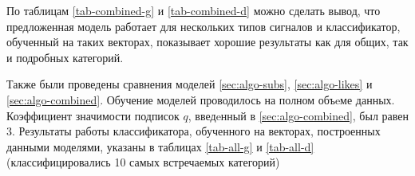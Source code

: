 \documentclass[times,specification,annotation]{itmo-student-thesis}
\begin{document}
%


По таблицам \ref{tab-combined-g} и \ref{tab-combined-d} можно сделать вывод, что предложенная модель работает для нескольких типов сигналов и классификатор, обученный на таких векторах, показывает хорошие результаты как для общих, так и подробных категорий.

Также были проведены сравнения моделей \ref{sec:algo-subs},  \ref{sec:algo-likes} и  \ref{sec:algo-combined}. Обучение моделей проводилось на полном объeме данных. Коэффициент значимости подписок $q$, введeнный в \ref{sec:algo-combined}, был равен 3. Результаты работы классификатора, обученного на векторах, построенных данными моделями, указаны в таблицах \ref{tab-all-g} и  \ref{tab-all-d} (классифицировались 10 самых встречаемых категорий)
\end{document}
